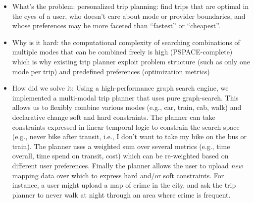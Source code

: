 \documentclass[letterpaper]{article}
\begin{document}
\begin{itemize}
	\item What's the problem: personalized trip planning: find trips that
	  are optimal in the eyes of a user, who doesn't care about mode or
	  provider boundaries, and whose preferences may be more faceted than
	  ``fastest'' or ``cheapest''.
	\item Why is it hard: the computational complexity of searching
	  combinations of multiple modes that can be combined freely is high
	  (PSPACE-complete\cite{}) which is why existing trip planner exploit problem
	  structure (such as only one mode per trip) and predefined
	  preferences (optimization metrics)
	\item How did we solve it: Using a high-performance graph search
	  engine\cite{}, we implemented a multi-modal trip planner that uses pure
	  graph-search. This allows us to flexibly combine various modes
	  (e.g., car, train, cab, walk) and declarative change soft and hard
	  constraints. The planner can take constraints expressed in linear
	  temporal logic to constrain the search space (e.g., never bike after
	  transit, i.e., I don't want to take my bike on the bus or train).
	  The planner uses a weighted sum over several metrics (e.g., time
	  overall, time spend on transit, cost) which can be re-weighted based
	  on different user preferences. Finally the planner allows the user
	  to upload {\em new} mapping data over which to express hard and/or
	  soft constraints. For instance, a user might upload a map of crime
	  in the city, and ask the trip planner to never walk at night through
	  an area where crime is frequent.
\end{itemize}
\end{document}
